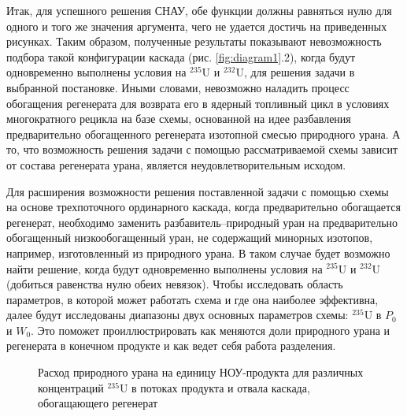 Итак, для успешного решения СНАУ, обе функции должны равняться нулю для одного и того же значения аргумента, чего не удается достичь на приведенных рисунках.
Таким образом, полученные результаты показывают невозможность подбора такой конфигурации каскада (рис. \ref{fig:diagram1}.2), когда будут одновременно выполнены условия на $^{235}$U и $^{232}$U, для решения задачи в выбранной постановке. Иными словами, невозможно наладить процесс обогащения регенерата для возврата его в ядерный топливный цикл в условиях многократного рецикла на базе схемы, основанной на идее разбавления предварительно обогащенного регенерата изотопной смесью природного урана. А то, что возможность решения задачи с помощью рассматриваемой схемы зависит от состава регенерата урана, является неудовлетворительным исходом. 

Для расширения возможности решения поставленной задачи с помощью схемы на основе трехпоточного ординарного каскада, когда предварительно обогащается регенерат, необходимо заменить разбавитель--природный уран на предварительно обогащенный низкообогащенный уран, не содержащий минорных изотопов, например, изготовленный из природного урана. В таком случае будет возможно найти решение, когда будут одновременно выполнены условия на $^{235}$U и $^{232}$U (добиться равенства нулю обеих невязок). Чтобы исследовать область параметров, в которой может работать схема и где она наиболее эффективна, далее будут исследованы диапазоны двух основных параметров схемы: $^{235}$U в $P_0$ и $W_0$. Это поможет проиллюстрировать как меняются доли природного урана и регенерата в конечном продукте и как ведет себя работа разделения.

\begin{figure}[ht]
  \caption{Расход природного урана на единицу НОУ-продукта  для различных концентраций $^{235}$U в потоках продукта и отвала каскада, обогащающего регенерат}\label{fig:sc2_2}
\end{figure}

